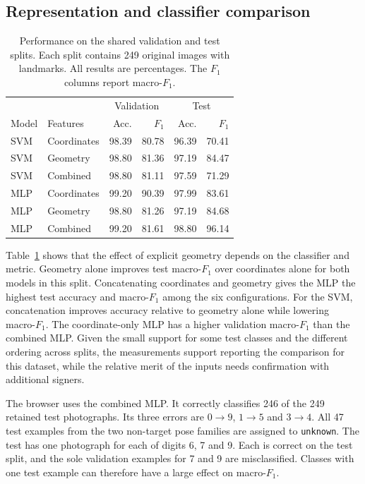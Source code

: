\subsection{Representation and classifier comparison}

\begin{table}[t]
  \centering
  \caption{Performance on the shared validation and test splits. Each split
  contains 249 original images with landmarks. All results are percentages. The $F_1$ columns report macro-$F_1$.}
  \label{tab:models}
  \small
  \setlength{\tabcolsep}{4pt}
  \begin{tabular}{llrrrr}
  \hline
  & & \multicolumn{2}{c}{Validation} & \multicolumn{2}{c}{Test} \\
  Model & Features & Acc. & $F_1$ & Acc. & $F_1$ \\
  \hline
  SVM & Coordinates & 98.39 & 80.78 & 96.39 & 70.41 \\
  SVM & Geometry    & 98.80 & 81.36 & 97.19 & 84.47 \\
  SVM & Combined    & 98.80 & 81.11 & 97.59 & 71.29 \\
  MLP & Coordinates & 99.20 & 90.39 & 97.99 & 83.61 \\
  MLP & Geometry    & 98.80 & 81.26 & 97.19 & 84.68 \\
  MLP & Combined    & 99.20 & 81.61 & 98.80 & 96.14 \\
  \hline
  \end{tabular}
\end{table}

Table~\ref{tab:models} shows that the effect of explicit geometry depends on
the classifier and metric. Geometry alone improves test macro-$F_1$ over
coordinates alone for both models in this split. Concatenating coordinates
and geometry gives the MLP the highest test accuracy and macro-$F_1$ among
the six configurations. For the SVM, concatenation improves accuracy relative
to geometry alone while lowering macro-$F_1$. The coordinate-only MLP has a
higher validation macro-$F_1$ than the combined MLP. Given the small support for
some test classes and the different ordering across splits, the measurements
support reporting the comparison for this dataset, while the relative merit
of the inputs needs confirmation with additional signers.

The browser uses the combined MLP. It correctly classifies 246 of the
249 retained test photographs. Its three errors are $0\to9$, $1\to5$ and
$3\to4$. All 47 test examples from the two non-target pose families are
assigned to \texttt{unknown}. The test has one photograph for each of digits
6, 7 and 9. Each is correct on the test split, and the sole validation
examples for 7 and 9 are misclassified. Classes with one test example can
therefore have a large effect on macro-$F_1$.


